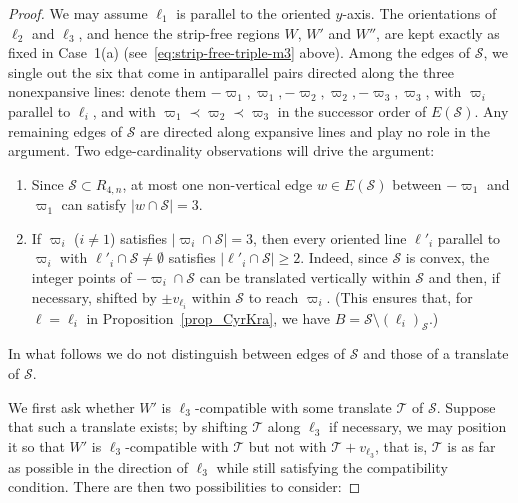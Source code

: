 \documentclass[12pt]{amsart}
\numberwithin{equation}{section}
\begin{document}
\begin{proof}
We may assume $\pmb{\ell}_1$ is parallel to the oriented $y$-axis. The
orientations of $\pmb{\ell}_2$ and $\pmb{\ell}_3$, and hence the
strip-free regions $W$, $W'$ and $W''$, are kept exactly as fixed in
Case~1(a) (see~\eqref{eq:strip-free-triple-m3} above). Among the edges of
$\mathcal{S}$, we single out the six that come in antiparallel pairs
directed along the three nonexpansive lines: denote them
$-\varpi_1,\varpi_1,-\varpi_2,\varpi_2,-\varpi_3,\varpi_3$, with
$\varpi_i$ parallel to $\pmb{\ell}_i$, and with $\varpi_1 \prec \varpi_2
\prec \varpi_3$ in the successor order of $E(\mathcal{S})$. Any remaining
edges of $\mathcal{S}$ are directed along expansive lines and play no
role in the argument. Two edge-cardinality observations will drive the
argument:
\begin{enumerate}[label=(\roman*)]\setlength{\itemsep}{5pt}
\item Since $\mathcal{S} \subset R_{4,n}$, at most one non-vertical
edge $w \in E(\mathcal{S})$ between $-\varpi_1$ and $\varpi_1$ can
satisfy $|w \cap \mathcal{S}| = 3$.

\item If $\varpi_i$ ($i \neq 1$) satisfies $|\varpi_i \cap \mathcal{S}| = 3$,
then every oriented line $\pmb{\ell}'_i$ parallel to $\varpi_i$ with
$\pmb{\ell}'_i \cap \mathcal{S} \neq \emptyset$ satisfies
$|\pmb{\ell}'_i \cap \mathcal{S}| \geq 2$. Indeed, since $\mathcal{S}$
is convex, the integer points of $-\varpi_i \cap \mathcal{S}$ can be
translated vertically within $\mathcal{S}$ and then, if necessary,
shifted by $\pm v_{\pmb{\ell}_i}$ within $\mathcal{S}$ to reach
$\varpi_i$. (This ensures that, for $\pmb{\ell} = \pmb{\ell}_i$ in Proposition~\ref{prop_CyrKra}, 
we have \( B = \mathcal{S} \setminus (\pmb{\ell}_i)_{\mathcal{S}} \).)
\end{enumerate}

In what follows we do not distinguish between edges of $\mathcal{S}$ and
those of a translate of $\mathcal{S}$.

\smallskip
We first ask whether $W'$ is $\pmb{\ell}_3$-compatible with some translate
$\mathcal{T}$ of $\mathcal{S}$. Suppose that such a translate exists;
by shifting $\mathcal{T}$ along $\pmb{\ell}_3$ if necessary, we may
position it so that $W'$ is $\pmb{\ell}_3$-compatible with $\mathcal{T}$
but not with $\mathcal{T}+v_{\pmb{\ell}_3}$, that is, $\mathcal{T}$
is as far as possible in the direction of $\pmb{\ell}_3$ while still
satisfying the compatibility condition. There are then two possibilities to consider:


\end{proof}
\end{document}
